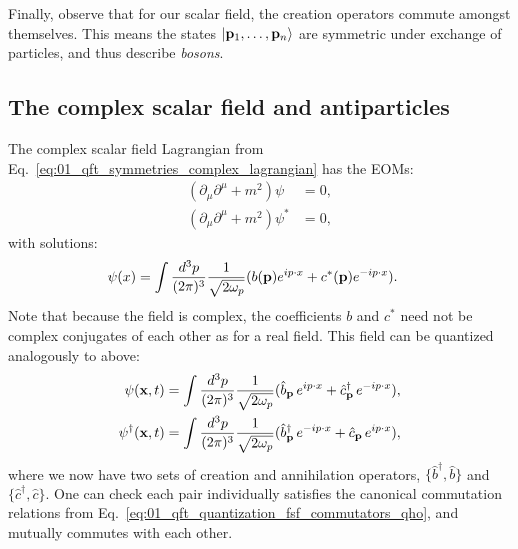Finally, observe that for our scalar field, the creation operators commute amongst themselves.
This means the states $\ket{\mathbf{p}_1, \ldots, \mathbf{p}_n}$ are symmetric under exchange of particles, and thus describe \textit{bosons}.

\subsection{The complex scalar field and antiparticles}
\label{sec:01_qft_quantization_complex}

The complex scalar field Lagrangian from Eq.~\ref{eq:01_qft_symmetries_complex_lagrangian} has the EOMs:
\begin{equation}
    \label{eq:01_qft_quantization_complex_eoms}
    \begin{split}
        (\partial_\mu\partial^\mu + m^2)\psi &= 0, \\
        (\partial_\mu\partial^\mu + m^2)\psi^* &= 0,
    \end{split}
\end{equation}
with solutions:
\begin{equation}
    \label{eq:01_qft_quantization_complex_solutions}
    \begin{split}
        \psi(x) &= \int \frac{d^3p}{(2\pi)^3} \frac{1}{\sqrt{2\omega_p}} (b(\mathbf{p})e^{ip\cdot x} + c^*(\mathbf{p}) e^{-ip\cdot x}).
    \end{split}
\end{equation}
Note that because the field is complex, the coefficients $b$ and $c^*$ need not be complex conjugates of each other as for a real field.
This field can be quantized analogously to above:
\begin{equation}
    \label{eq:01_qft_quantization_complex_fields}
    \begin{split}
        \psi(\mathbf{x}, t) &= \int \frac{d^3p}{(2\pi)^3} \frac{1}{\sqrt{2\omega_p}} (\hat b_{\mathbf{p}}\,e^{ip\cdot x} + \hat c^\dagger_{\mathbf{p}}\, e^{-ip\cdot x}), \\
        \psi^\dagger(\mathbf{x}, t) &= \int \frac{d^3p}{(2\pi)^3} \frac{1}{\sqrt{2\omega_p}} (\hat b^\dagger_{\mathbf{p}}\,e^{-ip\cdot x} + \hat c_{\mathbf{p}}\, e^{ip\cdot x}),
    \end{split}
\end{equation}
where we now have two sets of creation and annihilation operators, $\{\hat b^\dagger, \hat b\}$ and $\{\hat c^\dagger, \hat c\}$.
One can check each pair individually satisfies the canonical commutation relations from Eq.~\ref{eq:01_qft_quantization_fsf_commutators_qho}, and mutually commutes with each other.


